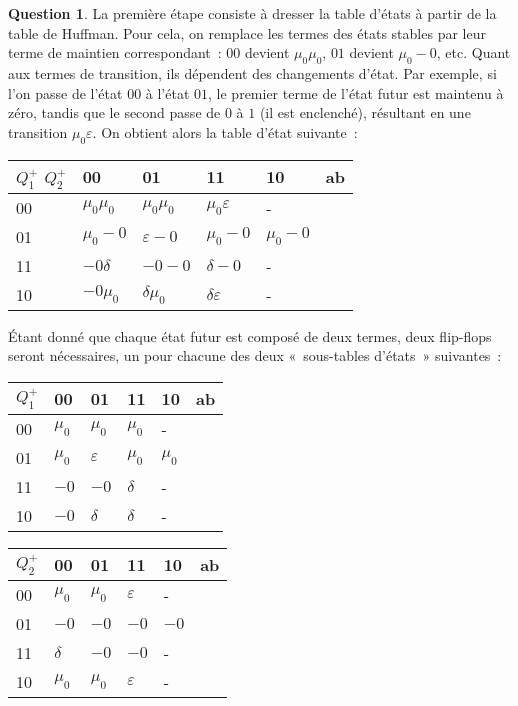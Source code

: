 \documentclass[11pt,a4paper]{article}
\theoremstyle{definition}%
\newtheorem{Q}{Question}[] %
\begin{document}
\begin{Q}
{		La première étape consiste à dresser la table d'états à partir de la table de Huffman.
		Pour cela, on remplace les termes des états stables par leur terme de maintien correspondant~: $00$ devient $\mu_0\mu_0$, $01$ devient $\mu_0-0$, etc.
		Quant aux termes de transition, ils dépendent des changements d'état. Par exemple, si l'on passe de l'état $00$ à l'état $01$, le premier terme de l'état futur est maintenu à zéro, tandis que le second passe de $0$ à $1$ (il est enclenché), résultant en une transition $\mu_0\varepsilon$.
		On obtient alors la table d'état suivante~:
		\begin{center}
			\begin{tabular}{|l|l|l|l|l|l} \hline
			$Q^+_1$ $Q^+_2$ & 00         & 01         & 11         & 10         & \multicolumn{1}{l|}{ab} \\ \hline
			00           & $\mu_0\mu_0$ & $\mu_0\mu_0$ & $\mu_0\varepsilon$ & - & \\ \cline{1-5}
			01           & $\mu_0-0$ & $\varepsilon-0$ & $\mu_0-0$ & $\mu_0-0$ & \\ \cline{1-5}
			11           & $-0\delta$ & $-0-0$ & $\delta-0$ & - & \\ \cline{1-5}
			10           & $-0\mu_0$ & $\delta\mu_0$ & $\delta\varepsilon$ & - & \\ \cline{1-5}
			\end{tabular}
		\end{center}

		Étant donné que chaque état futur est composé de deux termes, deux flip-flops seront nécessaires, un pour chacune des deux «~sous-tables d'états~» suivantes~:
		\begin{center}
			\begin{tabular}{|l|l|l|l|l|l} \hline
			$Q^+_1$ & 00         & 01         & 11         & 10         & \multicolumn{1}{l|}{ab} \\ \hline
			00           & $\mu_0$ & $\mu_0$ & $\mu_0$ & - & \\ \cline{1-5}
			01           & $\mu_0$ & $\varepsilon$ & $\mu_0$ & $\mu_0$ & \\ \cline{1-5}
			11           & $-0$ & $-0$ & $\delta$ & - & \\ \cline{1-5}
			10           & $-0$ & $\delta$ & $\delta$ & - & \\ \cline{1-5}
			\end{tabular}
			\begin{tabular}{|l|l|l|l|l|l} \hline
			$Q^+_2$ & 00         & 01         & 11         & 10         & \multicolumn{1}{l|}{ab} \\ \hline
			00           & $\mu_0$ & $\mu_0$ & $\varepsilon$ & - & \\ \cline{1-5}
			01           & $-0$ & $-0$ & $-0$ & $-0$ & \\ \cline{1-5}
			11           & $\delta$ & $-0$ & $-0$ & - & \\ \cline{1-5}
			10           & $\mu_0$ & $\mu_0$ & $\varepsilon$ & - & \\ \cline{1-5}
			\end{tabular}
		\end{center}


}
\end{Q}
\end{document}
